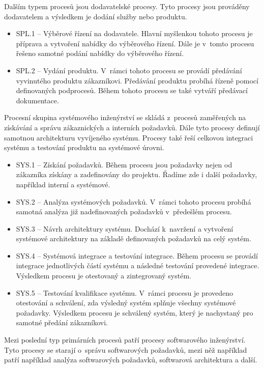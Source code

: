 \documentclass[czech,master]{diploma}
\begin{document}
Dalším typem procesů jsou dodavatelské procesy. Tyto procesy jsou prováděny dodavatelem a výsledkem je dodání služby nebo produktu.

\begin{itemize}
\item SPL.1 -- Výběrové řízení na dodavatele. Hlavní myšlenkou tohoto procesu je příprava a vytvoření nabídky do výběrového řízení.  Dále je v~tomto procesu řešeno samotné podání nabídky do výběrového řízení.
\item SPL.2 -- Vydání produktu. V~rámci tohoto procesu se provádí předávání vyvinutého produktu zákazníkovi. Předávání produktu probíhá řízeně pomocí definovaných podprocesů. Během tohoto procesu se také vytváří předávací dokumentace.
\end{itemize}

Procesní skupina systémového inženýrství se skládá z~procesů zaměřených na získávání a správu zákaznických a interních požadavků. Dále tyto procesy definují samotnou architekturu vyvíjeného systému. Procesy také řeší celkovou integraci systému a testování produktu na systémové úrovni.

\begin{itemize}
\item SYS.1 -- Získání požadavků. Během procesu jsou požadavky nejen od zákazníka získány a zadefinovány do projektu. Řadíme zde i další požadavky, například interní a systémové.
\item SYS.2 -- Analýza systémových požadavků. V~rámci tohoto procesu probíhá samotná analýza již nadefinovaných požadavků v~předešlém procesu.
\item SYS.3 -- Návrh architektury systému. Dochází k~navržení a vytvoření systémové architektury na základě definovaných požadavků na celý systém.
\item SYS.4 -- Systémová integrace a testování integrace. Během procesu se provádí integrace jednotlivých částí systému a následné testování provedené integrace. Výsledkem procesu je otestovaný a zintegrovaný systém.
\item SYS.5 -- Testování kvalifikace systému. V~rámci procesu je provedeno otestování a schválení, zda výsledný systém splňuje všechny systémové požadavky. Výsledkem procesu je schválený systém, který je nachystaný pro samotné předání zákazníkovi.
\end{itemize}

Mezi poslední typ primárních procesů patří procesy softwarového inženýrství. Tyto procesy se starají o~správu softwarových požadavků, mezi něž například patří například analýza softwarových požadavků, softwarová architektura a další.
\end{document}
